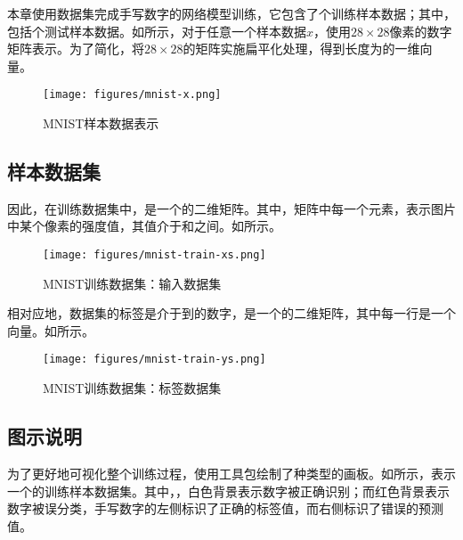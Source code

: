 \begin{content}

本章使用数据集完成手写数字的网络模型训练，它包含了个训练样本数据；其中，包括个测试样本数据。如所示，对于任意一个样本数据$x$，使用$28 \times 28$像素的数字矩阵表示。为了简化，将$28 \times 28$的矩阵实施扁平化处理，得到长度为的一维向量。

\begin{figure}[H]
\centering
\texttt{[image: figures/mnist-x.png]}
\caption{MNIST样本数据表示}
 \label{fig:mnist-x}
\end{figure}

\subsection{样本数据集}

因此，在训练数据集中，是一个\code{[60000, 784]}的二维矩阵。其中，矩阵中每一个元素，表示图片中某个像素的强度值，其值介于和之间。如所示。

\begin{figure}[H]
\centering
\texttt{[image: figures/mnist-train-xs.png]}
\caption{MNIST训练数据集：输入数据集}
 \label{fig:mnist-train-xs}
\end{figure}

相对应地，数据集的标签是介于到的数字，是一个\code{[60000, 10]}的二维矩阵，其中每一行是一个向量。如所示。

\begin{figure}[H]
\centering
\texttt{[image: figures/mnist-train-ys.png]}
\caption{MNIST训练数据集：标签数据集}
 \label{fig:mnist-train-ys}
\end{figure}

\subsection{图示说明}

为了更好地可视化整个训练过程，使用工具包绘制了种类型的画板。如所示，表示一个的训练样本数据集。其中，，白色背景表示数字被正确识别；而红色背景表示数字被误分类，手写数字的左侧标识了正确的标签值，而右侧标识了错误的预测值。


\end{content}
